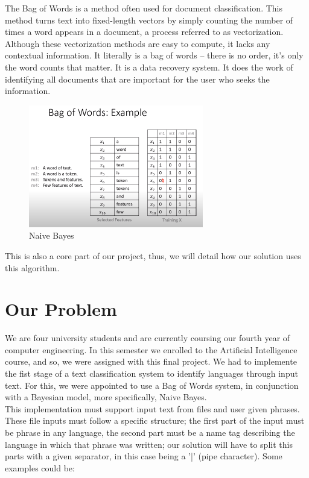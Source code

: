\documentclass[sigconf,12pt,review=false,natbib=false]{acmart}
\begin{document}
The Bag of Words is a method often used for document classification. This method turns text into fixed-length
vectors by simply counting the number of times a word appears in a document, a process referred to as vectorization. \\

Although these vectorization methods are easy to compute, it lacks any contextual information. It literally is a bag
of words – there is no order, it’s only the word counts that matter.
It is a data recovery system. It does the work of identifying all documents that are important for the user who
seeks the information. \\

\begin{figure}[h!]
    \centering
    \includegraphics[width=3in]{bow}
    \caption{Naive Bayes}
    \label{fig:bow}
\end{figure}

This is also a core part of our project, thus, we will detail how our solution uses this algorithm.

\section{Our Problem}

We are four university students and are currently coursing our fourth year of computer engineering. In this semester
we enrolled to the Artificial Intelligence course, and so, we were assigned with this final project. We had to 
implemente the fist stage of a text classification system to identify languages through input text.
For this, we were appointed to use a Bag of Words system, in conjunction with a Bayesian model, more specifically,
Naive Bayes. \\

This implementation must support input text from files and user given phrases. These file inputs must follow a specific
structure; the first part of the input must be phrase in any language, the second part must be a name tag describing
the language in which that phrase was written; our solution will have to split this parts with a given separator,
in this case being a '|' (pipe character). Some examples could be: \\ 
\end{document}

